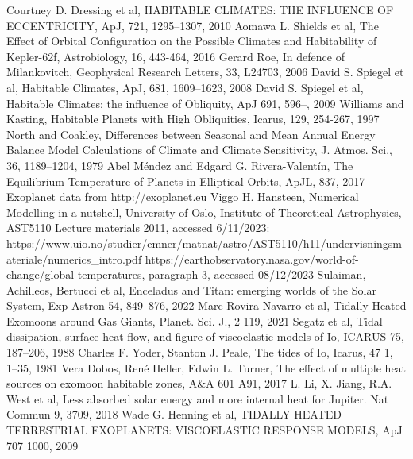 \documentclass[12pt, onecolumn]{revtex4-2}    %
\begin{document}
\begin{thebibliography}{}
     Courtney D. Dressing et al, HABITABLE CLIMATES: THE INFLUENCE OF ECCENTRICITY, ApJ, 721, 1295--1307, 2010
     Aomawa L. Shields et al, The Effect of Orbital Configuration on the Possible Climates and Habitability of Kepler-62f, Astrobiology, 16, 443-464, 2016
     Gerard Roe, In defence of Milankovitch, Geophysical Research Letters, 33, L24703, 2006
     David S. Spiegel et al, Habitable Climates, ApJ, 681, 1609--1623, 2008
     David S. Spiegel et al, Habitable Climates: the influence of Obliquity, ApJ 691, 596--, 2009
     Williams and Kasting, Habitable Planets with High Obliquities, Icarus, 129, 254-267, 1997
     North and Coakley, Differences between Seasonal and Mean Annual Energy Balance Model Calculations of Climate and Climate Sensitivity, J. Atmos. Sci., 36, 1189--1204, 1979
     Abel Méndez and Edgard G. Rivera-Valentín, The Equilibrium Temperature of Planets in Elliptical Orbits, ApJL, 837, 2017
     Exoplanet data from http://exoplanet.eu
     Viggo H. Hansteen, Numerical Modelling in a nutshell, University of Oslo, Institute of Theoretical Astrophysics, AST5110 Lecture materials 2011, accessed 6/11/2023: https://www.uio.no/studier/emner/matnat/astro/AST5110/h11/undervisningsmateriale/numerics\_intro.pdf
     https://earthobservatory.nasa.gov/world-of-change/global-temperatures, paragraph 3, accessed 08/12/2023
     Sulaiman, Achilleos, Bertucci et al, Enceladus and Titan: emerging worlds of the Solar System, Exp Astron 54, 849--876, 2022
     Marc Rovira-Navarro et al, Tidally Heated Exomoons around Gas Giants, Planet. Sci. J., 2 119, 2021
     Segatz et al, Tidal dissipation, surface heat flow, and figure of viscoelastic models of Io, ICARUS 75, 187--206, 1988
     Charles F. Yoder, Stanton J. Peale, The tides of Io, Icarus, 47 1, 1--35, 1981
     Vera Dobos, René Heller, Edwin L. Turner, The effect of multiple heat sources on exomoon habitable zones, A\&A 601 A91, 2017
     L. Li, X. Jiang, R.A. West et al, Less absorbed solar energy and more internal heat for Jupiter. Nat Commun 9, 3709, 2018
     Wade G. Henning et al, TIDALLY HEATED TERRESTRIAL EXOPLANETS: VISCOELASTIC RESPONSE MODELS, ApJ 707 1000, 2009
\end{thebibliography}
\end{document}
